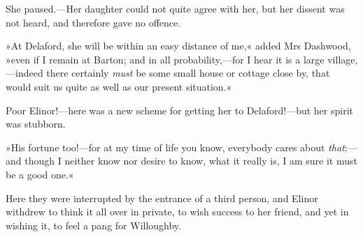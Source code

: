 She paused.—Her daughter could not quite agree with her, but her dissent was not heard, and therefore gave no offence.

»At Delaford, she will be within an easy distance of me,« added Mrs Dashwood, »even if I remain at Barton; and in all probability,—for I hear it is a large village,—indeed there certainly \textit{must} be some small house or cottage close by, that would suit us quite as well as our present situation.«

Poor Elinor!—here was a new scheme for getting her to Delaford!—but her spirit was stubborn.

»His fortune too!—for at my time of life you know, everybody cares about \textit{that};—and though I neither know nor desire to know, what it really is, I am sure it must be a good one.«

Here they were interrupted by the entrance of a third person, and Elinor withdrew to think it all over in private, to wish success to her friend, and yet in wishing it, to feel a pang for Willoughby.